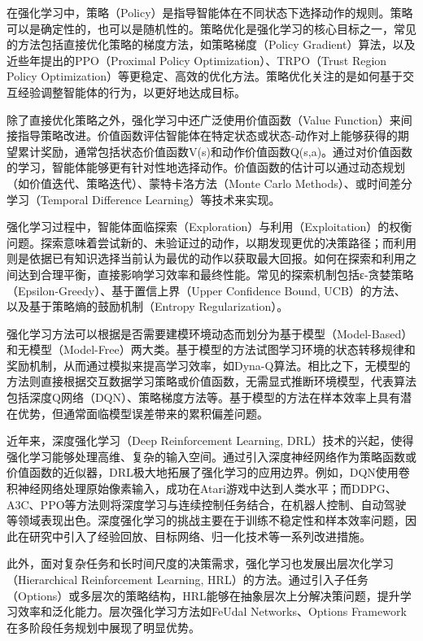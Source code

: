 在强化学习中，策略（Policy）是指导智能体在不同状态下选择动作的规则。策略可以是确定性的，也可以是随机性的。策略优化是强化学习的核心目标之一，常见的方法包括直接优化策略的梯度方法，如策略梯度（Policy Gradient）算法\cite{silver2014deterministic}，以及近些年提出的PPO\cite{yu2022surprising}（Proximal Policy Optimization）、TRPO\cite{schulman2015trust}（Trust Region Policy Optimization）等更稳定、高效的优化方法。策略优化关注的是如何基于交互经验调整智能体的行为，以更好地达成目标。

除了直接优化策略之外，强化学习中还广泛使用价值函数（Value Function）来间接指导策略改进。价值函数评估智能体在特定状态或状态-动作对上能够获得的期望累计奖励，通常包括状态价值函数V(s)和动作价值函数Q(s,a)。通过对价值函数的学习，智能体能够更有针对性地选择动作。价值函数的估计可以通过动态规划（如价值迭代、策略迭代）、蒙特卡洛方法\cite{chaslot2010monte}（Monte Carlo Methods）、或时间差分学习\cite{tesauro1991practical}（Temporal Difference Learning）等技术来实现。

强化学习过程中，智能体面临探索（Exploration）与利用（Exploitation）的权衡问题。探索意味着尝试新的、未验证过的动作，以期发现更优的决策路径；而利用则是依据已有知识选择当前认为最优的动作以获取最大回报。如何在探索和利用之间达到合理平衡，直接影响学习效率和最终性能。常见的探索机制包括ε-贪婪策略\cite{wunder2010classes}（Epsilon-Greedy）、基于置信上界\cite{auer2002finite}（Upper Confidence Bound, UCB）的方法、以及基于策略熵的鼓励机制（Entropy Regularization）。

强化学习方法可以根据是否需要建模环境动态而划分为基于模型（Model-Based）和无模型（Model-Free）两大类。基于模型的方法试图学习环境的状态转移规律和奖励机制，从而通过模拟来提高学习效率，如Dyna-Q\cite{peng2018deep}算法。相比之下，无模型的方法则直接根据交互数据学习策略或价值函数，无需显式推断环境模型，代表算法包括深度Q网络（DQN）、策略梯度方法等。基于模型的方法在样本效率上具有潜在优势，但通常面临模型误差带来的累积偏差问题。

近年来，深度强化学习\cite{li2019deep}（Deep Reinforcement Learning, DRL）技术的兴起，使得强化学习能够处理高维、复杂的输入空间。通过引入深度神经网络作为策略函数或价值函数的近似器，DRL极大地拓展了强化学习的应用边界。例如，DQN使用卷积神经网络处理原始像素输入，成功在Atari游戏中达到人类水平；而DDPG、A3C、PPO等方法则将深度学习与连续控制任务结合，在机器人控制、自动驾驶等领域表现出色。深度强化学习的挑战主要在于训练不稳定性和样本效率问题，因此在研究中引入了经验回放、目标网络、归一化技术等一系列改进措施。

此外，面对复杂任务和长时间尺度的决策需求，强化学习也发展出层次化学习（Hierarchical Reinforcement Learning, HRL）\cite{nachum2018data}的方法。通过引入子任务（Options）或多层次的策略结构，HRL能够在抽象层次上分解决策问题，提升学习效率和泛化能力。层次强化学习方法如FeUdal Networks、Options Framework在多阶段任务规划中展现了明显优势。

